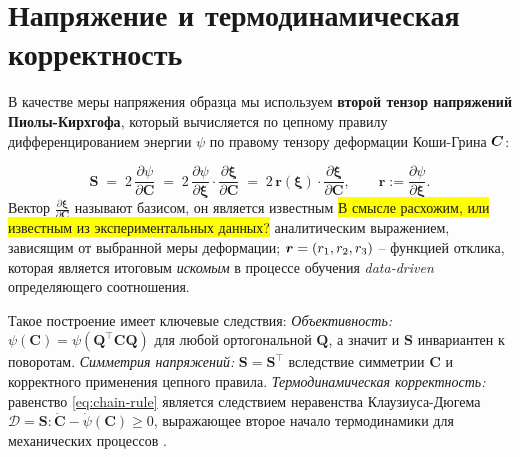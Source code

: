 \section{Напряжение и термодинамическая корректность}

В качестве меры напряжения образца мы используем \textbf{второй тензор напряжений Пиолы-Кирхгофа}, который вычисляется по цепному правилу дифференцированием энергии \(\psi\) 
по правому тензору деформации Коши-Грина \(\boldsymbol{C}\):

\begin{equation}
  \mathbf{S} \;=\; 2\,\frac{\partial \psi}{\partial \mathbf{C}}
  \;=\; 2\,\frac{\partial \psi}{\partial \boldsymbol\xi} \cdot \frac{\partial \boldsymbol\xi}{\partial \mathbf{C}}
  \;=\; 2\,\mathbf{r}(\boldsymbol\xi)\cdot\frac{\partial \boldsymbol\xi}{\partial \mathbf{C}},
  \qquad \mathbf{r}:=\frac{\partial \psi}{\partial \boldsymbol\xi}.
  \label{eq:chain-rule}
\end{equation}
Вектор $\frac{\partial \boldsymbol\xi}{\partial \mathbf{C}}$ называют базисом, он является известным \colorbox{yellow}{В смысле расхожим, или известным из экспериментальных данных?} аналитическим выражением, зависящим от выбранной меры деформации; $\boldsymbol{r} = (r_1, r_2, r_3)$ -- функцией отклика, которая является итоговым \textit{искомым} в процессе обучения \textit{data-driven} определяющего соотношения.   

Такое построение имеет ключевые следствия:
\newline
\textit{Объективность:} $\psi(\mathbf{C})=\psi(\mathbf{Q}^\top\mathbf{C}\mathbf{Q})$ для любой ортогональной $\mathbf{Q}$, а значит и $\mathbf{S}$ инвариантен к поворотам.
\newline
\textit{Симметрия напряжений:} $\mathbf{S}=\mathbf{S}^\top$ вследствие симметрии $\mathbf{C}$ и корректного применения цепного правила.
\newline
\textit{Термодинамическая корректность:} равенство \eqref{eq:chain-rule} является следствием неравенства Клаузиуса-Дюгема 
$\mathcal{D} = \mathbf{S} : \dot{\mathbf{C}} - \dot{\psi}(\mathbf{C}) \geq 0$, 
выражающее второе начало термодинамики для механических процессов \cite{truesdell1984historical,truesdell2004nonlinear}.

